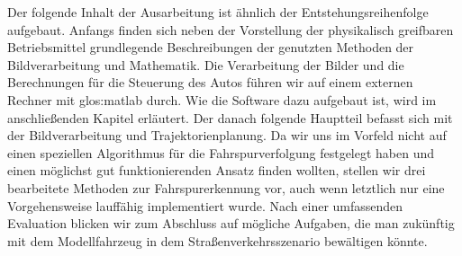 Der folgende Inhalt der Ausarbeitung ist ähnlich der Entstehungsreihenfolge aufgebaut. Anfangs finden sich neben der Vorstellung der physikalisch greifbaren Betriebsmittel grundlegende Beschreibungen der genutzten Methoden der Bildverarbeitung und Mathematik. Die Verarbeitung der Bilder und die Berechnungen für die Steuerung des Autos führen wir auf einem externen Rechner mit \gls{glos:matlab} durch. Wie die Software dazu aufgebaut ist, wird im anschließenden Kapitel erläutert. Der danach folgende Hauptteil befasst sich mit der Bildverarbeitung und Trajektorienplanung. Da wir uns im Vorfeld nicht auf einen speziellen Algorithmus für die Fahrspurverfolgung festgelegt haben und einen möglichst gut funktionierenden Ansatz finden wollten, stellen wir drei bearbeitete Methoden zur Fahrspurerkennung vor, auch wenn letztlich nur eine Vorgehensweise lauffähig implementiert wurde. Nach einer umfassenden Evaluation blicken wir zum Abschluss auf mögliche Aufgaben, die man zukünftig mit dem Modellfahrzeug in dem Straßenverkehrsszenario bewältigen könnte.



